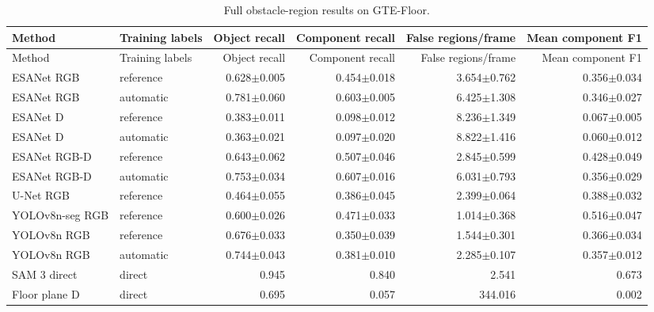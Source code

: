 \begin{longtable}{llrrrr}
\caption{Full obstacle-region results on GTE-Floor.}\label{tab:full-component}\\
\toprule Method & Training labels & Object recall & Component recall & False regions/frame & Mean component F1\\\midrule\endfirsthead
\toprule Method & Training labels & Object recall & Component recall & False regions/frame & Mean component F1\\\midrule\endhead
ESANet RGB & reference & 0.628$\pm$0.005 & 0.454$\pm$0.018 & 3.654$\pm$0.762 & 0.356$\pm$0.034\\
ESANet RGB & automatic & 0.781$\pm$0.060 & 0.603$\pm$0.005 & 6.425$\pm$1.308 & 0.346$\pm$0.027\\
ESANet D & reference & 0.383$\pm$0.011 & 0.098$\pm$0.012 & 8.236$\pm$1.349 & 0.067$\pm$0.005\\
ESANet D & automatic & 0.363$\pm$0.021 & 0.097$\pm$0.020 & 8.822$\pm$1.416 & 0.060$\pm$0.012\\
ESANet RGB-D & reference & 0.643$\pm$0.062 & 0.507$\pm$0.046 & 2.845$\pm$0.599 & 0.428$\pm$0.049\\
ESANet RGB-D & automatic & 0.753$\pm$0.034 & 0.607$\pm$0.016 & 6.031$\pm$0.793 & 0.356$\pm$0.029\\
U-Net RGB & reference & 0.464$\pm$0.055 & 0.386$\pm$0.045 & 2.399$\pm$0.064 & 0.388$\pm$0.032\\
YOLOv8n-seg RGB & reference & 0.600$\pm$0.026 & 0.471$\pm$0.033 & 1.014$\pm$0.368 & 0.516$\pm$0.047\\
YOLOv8n RGB & reference & 0.676$\pm$0.033 & 0.350$\pm$0.039 & 1.544$\pm$0.301 & 0.366$\pm$0.034\\
YOLOv8n RGB & automatic & 0.744$\pm$0.043 & 0.381$\pm$0.010 & 2.285$\pm$0.107 & 0.357$\pm$0.012\\
SAM 3 direct & direct & 0.945 & 0.840 & 2.541 & 0.673\\
Floor plane D & direct & 0.695 & 0.057 & 344.016 & 0.002\\
\bottomrule\end{longtable}
